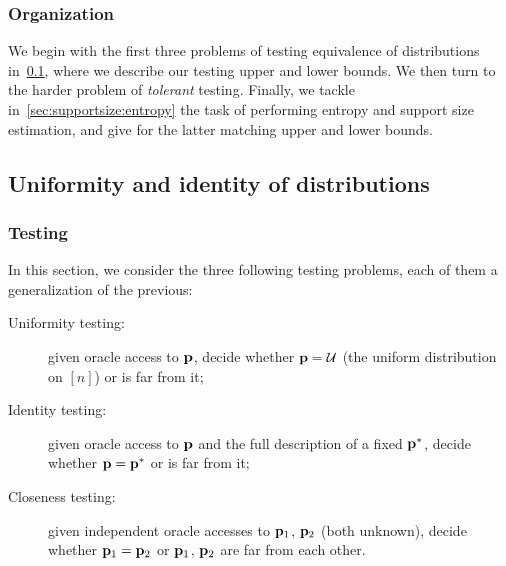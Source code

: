   \subsubsection{Organization}
  We begin with the first three problems of testing equivalence of distributions in~\cref{sec:uniformity:equivalence:identity}, where we describe our testing upper and lower bounds. We then turn to the harder problem of \emph{tolerant} testing. Finally, we tackle in~\cref{sec:supportsize:entropy} the task of performing entropy and support size estimation, and give for the latter matching upper and lower bounds.

 \subsection{Uniformity and identity of distributions}\label{sec:uniformity:equivalence:identity}
\subsubsection{Testing}\label{sec:uniformity:equivalence:identity:testing}
In this section, we consider the three following testing problems, each of them a generalization of the previous:
\begin{description}
  \item[Uniformity testing:] given oracle access to $\mathbf{p}$, decide whether $\mathbf{p}=\mathcal{U}$ (the uniform distribution on $[n]$) or is far from it;
  \item[Identity testing:] given oracle access to $\mathbf{p}$ and the full description of a fixed $\mathbf{p}^\ast$, decide whether $\mathbf{p}=\mathbf{p}^\ast$ or is far from it; 
  \item[Closeness testing:] given independent oracle accesses to $\mathbf{p}_1$, $\mathbf{p}_2$ (both unknown), decide whether $\mathbf{p}_1=\mathbf{p}_2$ or $\mathbf{p}_1$, $\mathbf{p}_2$ are far from each other. 
\end{description}

